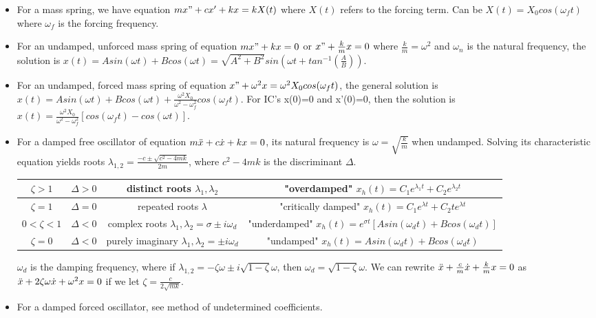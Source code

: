 \documentclass[8pt,letterpaper,boxed]{hmcpset}
\begin{document}
\begin{itemize}
    \item For a mass spring, we have equation $mx"+cx'+kx=kX(t)$ where $X(t)$ refers to the forcing term. Can be $X(t)=X_0 cos(\omega _f t)$ where $\omega _f$ is the forcing frequency.
    \item For an undamped, unforced mass spring of equation $mx"+kx=0$ or $x"+\frac{k}{m}x=0$ where $\frac{k}{m}=\omega^2$ and $\omega_n$ is the natural frequency, the solution is $x(t)=Asin(\omega t)+Bcos(\omega t)=\sqrt{A^2+B^2}sin(\omega t+tan^{-1}(\frac{A}{B}))$.
    \item For an undamped, forced mass spring of equation $x"+\omega^2x=\omega^2X_0cos(\omega_ft)$, the general solution is $x(t)=Asin(\omega t)+Bcos(\omega t)+\frac{\omega^2X_0}{\omega^2-\omega_f^2}cos(\omega_f t)$. For IC's x(0)=0 and x'(0)=0, then the solution is $x(t)=\frac{\omega^2X_0}{\omega^2-\omega_f^2}[cos(\omega_f t)-cos(\omega t)]$.
    \item For a damped free oscillator of equation $m\Ddot{x}+c\Dot{x}+kx=0$, its natural frequency is $\omega=\sqrt{\frac{k}{m}}$ when undamped. Solving its characteristic equation yields roots $\lambda_{1, 2}=\frac{-c\pm\sqrt{c^2-4mk}}{2m}$, where $c^2-4mk$ is the discriminant $\Delta$.
        \begin{center}
            \begin{tabular}{ | c | c | c | c | } 
                 \hline
                 $\zeta > 1$ & $\Delta > 0$ & distinct roots $\lambda_1,\lambda_2$ & "overdamped" $x_h(t)=C_1e^{\lambda_1 t}+C_2e^{\lambda_2 t}$ \\
                 \hline
                 $\zeta = 1$ & $\Delta = 0$ & repeated roots $\lambda$ & "critically damped" $x_h(t)=C_1e^{\lambda t}+C_2te^{\lambda t}$ \\
                 \hline
                 $0 < \zeta < 1$ & $\Delta < 0$ & complex roots $\lambda_1,\lambda_2 = \sigma \pm i \omega_d$ & "underdamped"  $x_h(t)=e^{\sigma t}[Asin(\omega_d t)+Bcos(\omega_d t)]$ \\
                 \hline
                 $\zeta = 0$ & $\Delta < 0$ & purely imaginary $\lambda_1,\lambda_2 = \pm i \omega_d$ & "undamped" $x_h(t)=Asin(\omega_d t)+Bcos(\omega_d t)$ \\
                 \hline
            \end{tabular}
            \newline
            $\omega_d$ is the damping frequency, where if $\lambda_{1, 2} = -\zeta\omega\pm i\sqrt{1-\zeta}\omega$, then $\omega_d=\sqrt{1-\zeta}\omega$. We can rewrite $\Ddot{x}+\frac{c}{m}\Dot{x}+\frac{k}{m}x=0$ as $\Ddot{x}+2\zeta\omega\Dot{x}+\omega^2x=0$ if we let $\zeta=\frac{c}{2\sqrt{mk}}$. 
        \end{center}
    \item For a damped forced oscillator, see method of undetermined coefficients.
\end{itemize}
\end{document}
